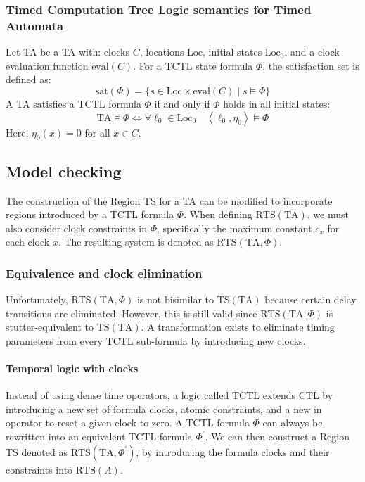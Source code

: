 \subsubsection{Timed Computation Tree Logic semantics for Timed Automata}
Let TA be a TA with: clocks $C$, locations $\text{Loc}$, initial states $\text{Loc}_0$, and a clock evaluation function $\text{eval}(C)$. 
For a TCTL state formula $\Phi$, the satisfaction set is defined as:
\[\text{sat}(\Phi)=\{s\in\text{Loc}\times\text{eval}(C)\mid s\models\Phi\}\]
A TA satisfies a TCTL formula $\Phi$ if and only if $\Phi$ holds in all initial states:
\[\text{TA}\models\Phi\Leftrightarrow\forall\ell_0\in\text{Loc}_0\quad\left\langle \ell_0,\eta_0\right\rangle\models\Phi \]
Here, $\eta_0(x)=0$ for all $x\in C$. 

\subsection{Model checking}
The construction of the Region TS for a TA can be modified to incorporate regions introduced by a TCTL formula $\Phi$. 
When defining $\text{RTS}(\text{TA})$, we must also consider clock constraints in $\Phi$, specifically the maximum constant $c_x$ for each clock $x$.
The resulting system is denoted as $\text{RTS}(\text{TA},\Phi)$. 

\subsubsection{Equivalence and clock elimination}
Unfortunately, $\text{RTS}(\text{TA},\Phi)$ is not bisimilar to $\text{TS}(\text{TA})$ because certain delay transitions are eliminated.
However, this is still valid since $\text{RTS}(\text{TA},\Phi)$ is stutter-equivalent to $\text{TS}(\text{TA})$.
A transformation exists to eliminate timing parameters from every TCTL sub-formula by introducing new clocks.

\paragraph*{Temporal logic with clocks}
Instead of using dense time operators, a logic called TCTL extends CTL by introducing a new set of formula clocks, atomic constraints, and a new in operator to reset a given clock to zero.
A TCTL formula $\Phi$ can always be rewritten into an equivalent TCTL formula $\Phi^\prime$.
We can then construct a Region TS  denoted as $\text{RTS}(\text{TA},\Phi^\prime)$, by introducing the formula clocks and their constraints into $\text{RTS}(A)$.

